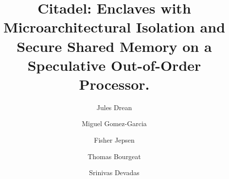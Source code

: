 \documentclass[nonacm,sigplan]{acmart}
\begin{document}
\title{Citadel: Enclaves with Microarchitectural Isolation and Secure Shared Memory on a Speculative Out-of-Order Processor.}

\author{Jules Drean}

\author{Miguel Gomez-Garcia}  

\author{Fisher Jepsen}  

\author{Thomas Bourgeat}  

\author{Srinivas Devadas}



\maketitle %
\pagestyle{plain} %












\end{document}
